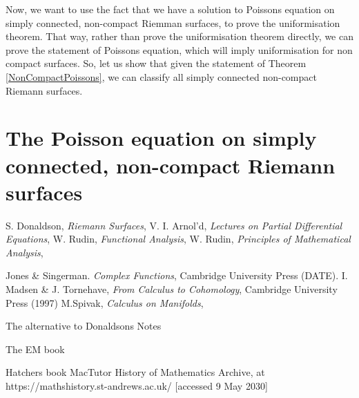 \documentclass[11pt]{report}
\theoremstyle{definition}
\begin{document}
Now, we want to use the fact that we have a solution to Poissons equation on simply connected, non-compact Riemman surfaces, to prove the uniformisation theorem. That way, rather than prove the uniformisation theorem directly, we can prove the statement of Poissons equation, which will imply uniformisation for non compact surfaces. So, let us show that given the statement of Theorem \ref{NonCompactPoissons}, we can classify all simply connected non-compact Riemann surfaces.

\section{The Poisson equation on simply connected, non-compact Riemann surfaces}

%
\begin{thebibliography}{99}
 S. Donaldson, {\em Riemann Surfaces},
 V. I. Arnol'd, {\em Lectures on Partial Differential Equations},
 W. Rudin, {\em Functional Analysis},
 W. Rudin, {\em Principles of Mathematical Analysis}, 

 Jones \& Singerman. {\em Complex Functions}, Cambridge University Press (DATE).
 I. Madsen \& J. Tornehave, {\em From Calculus to Cohomology}, Cambridge University Press (1997)
 M.Spivak, {\em Calculus on Manifolds}, 

 The alternative to Donaldsons Notes

 The EM book

 Hatchers book
%
 MacTutor History of Mathematics Archive, at https://mathshistory.st-andrews.ac.uk/ [accessed 9 May 2030]


\end{thebibliography}
\end{document}
